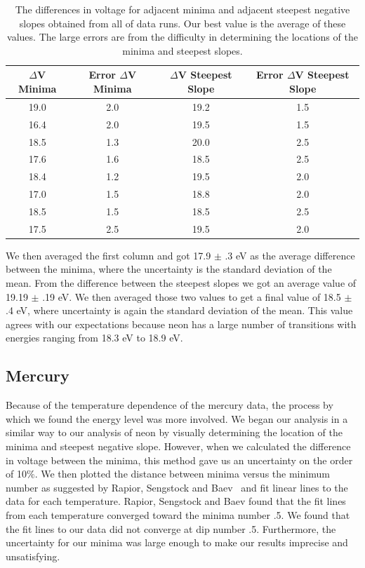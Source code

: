 \documentclass[prb,preprint]{revtex4-1}
\begin{document}
\begin{table}[h!]
\centering
\caption{The differences in voltage for adjacent minima and adjacent steepest negative slopes obtained from all of data runs. Our best value is the average of these values. The large errors are from the difficulty in determining the locations of the minima and steepest slopes.}

\begin{ruledtabular}
\begin{tabular}{c c c c}
$\Delta$V Minima & Error $\Delta$V Minima & $\Delta$V Steepest Slope &  Error $\Delta$V Steepest Slope\\
\hline	%
19.0 & 2.0 & 19.2 & 1.5  \\
16.4 & 2.0 & 19.5 & 1.5  \\
18.5 & 1.3 & 20.0 & 2.5  \\
17.6 & 1.6 & 18.5 & 2.5  \\
18.4 & 1.2 & 19.5 & 2.0  \\
17.0 & 1.5 & 18.8 & 2.0  \\
18.5 & 1.5 & 18.5 & 2.5  \\
17.5 & 2.5 & 19.5 & 2.0  \\

\end{tabular}
\end{ruledtabular}
\label{neon_dvs}
\end{table}

We then averaged the first column and got 17.9 $\pm$ .3 eV as the average difference between the minima, where the uncertainty is the standard deviation of the mean. From the difference between the steepest slopes we got an average value of 19.19 $\pm$ .19 eV. We then averaged those two values to get a final value of 18.5 $\pm$ .4 eV, where uncertainty is again the standard deviation of the mean. This value agrees with our expectations because neon has a large number of transitions with energies ranging from 18.3 eV to 18.9 eV.

\subsection{Mercury}

Because of the temperature dependence of the mercury data, the process by which we found the energy level was more involved. We began our analysis in a similar way to our analysis of neon by visually determining the location of the minima and steepest negative slope. However, when we calculated the difference in voltage between the minima, this method gave us an uncertainty on the order of 10$\%$. We then plotted the distance between minima versus the minimum number as suggested by Rapior, Sengstock and Baev~\cite{newfeatures} and fit linear lines to the data for each temperature. Rapior, Sengstock and Baev found that the fit lines from each temperature converged toward the minima number .5. We found that the fit lines to our data did not converge at dip number .5. Furthermore, the uncertainty for our minima was large enough to make our results imprecise and unsatisfying.
\end{document}
